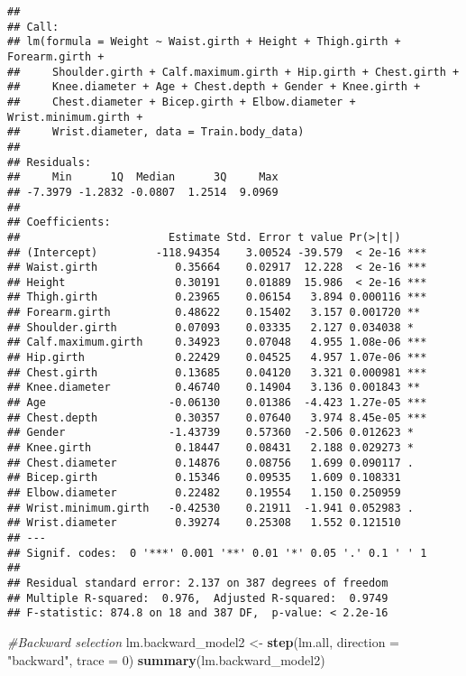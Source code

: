 \documentclass[
]{article}
\newenvironment{Shaded}{\begin{snugshade}}{\end{snugshade}}
\newcommand{\AttributeTok}[1]{\textcolor[rgb]{0.13,0.29,0.53}{#1}}
\newcommand{\CommentTok}[1]{\textcolor[rgb]{0.56,0.35,0.01}{\textit{#1}}}
\newcommand{\DecValTok}[1]{\textcolor[rgb]{0.00,0.00,0.81}{#1}}
\newcommand{\FunctionTok}[1]{\textcolor[rgb]{0.13,0.29,0.53}{\textbf{#1}}}
\newcommand{\NormalTok}[1]{#1}
\newcommand{\OtherTok}[1]{\textcolor[rgb]{0.56,0.35,0.01}{#1}}
\newcommand{\StringTok}[1]{\textcolor[rgb]{0.31,0.60,0.02}{#1}}
\begin{document}
\begin{verbatim}
## 
## Call:
## lm(formula = Weight ~ Waist.girth + Height + Thigh.girth + Forearm.girth + 
##     Shoulder.girth + Calf.maximum.girth + Hip.girth + Chest.girth + 
##     Knee.diameter + Age + Chest.depth + Gender + Knee.girth + 
##     Chest.diameter + Bicep.girth + Elbow.diameter + Wrist.minimum.girth + 
##     Wrist.diameter, data = Train.body_data)
## 
## Residuals:
##     Min      1Q  Median      3Q     Max 
## -7.3979 -1.2832 -0.0807  1.2514  9.0969 
## 
## Coefficients:
##                       Estimate Std. Error t value Pr(>|t|)    
## (Intercept)         -118.94354    3.00524 -39.579  < 2e-16 ***
## Waist.girth            0.35664    0.02917  12.228  < 2e-16 ***
## Height                 0.30191    0.01889  15.986  < 2e-16 ***
## Thigh.girth            0.23965    0.06154   3.894 0.000116 ***
## Forearm.girth          0.48622    0.15402   3.157 0.001720 ** 
## Shoulder.girth         0.07093    0.03335   2.127 0.034038 *  
## Calf.maximum.girth     0.34923    0.07048   4.955 1.08e-06 ***
## Hip.girth              0.22429    0.04525   4.957 1.07e-06 ***
## Chest.girth            0.13685    0.04120   3.321 0.000981 ***
## Knee.diameter          0.46740    0.14904   3.136 0.001843 ** 
## Age                   -0.06130    0.01386  -4.423 1.27e-05 ***
## Chest.depth            0.30357    0.07640   3.974 8.45e-05 ***
## Gender                -1.43739    0.57360  -2.506 0.012623 *  
## Knee.girth             0.18447    0.08431   2.188 0.029273 *  
## Chest.diameter         0.14876    0.08756   1.699 0.090117 .  
## Bicep.girth            0.15346    0.09535   1.609 0.108331    
## Elbow.diameter         0.22482    0.19554   1.150 0.250959    
## Wrist.minimum.girth   -0.42530    0.21911  -1.941 0.052983 .  
## Wrist.diameter         0.39274    0.25308   1.552 0.121510    
## ---
## Signif. codes:  0 '***' 0.001 '**' 0.01 '*' 0.05 '.' 0.1 ' ' 1
## 
## Residual standard error: 2.137 on 387 degrees of freedom
## Multiple R-squared:  0.976,  Adjusted R-squared:  0.9749 
## F-statistic: 874.8 on 18 and 387 DF,  p-value: < 2.2e-16
\end{verbatim}

\begin{Shaded}
\begin{Highlighting}[]
\CommentTok{\#Backward selection}
\NormalTok{lm.backward\_model2 }\OtherTok{\textless{}{-}} \FunctionTok{step}\NormalTok{(lm.all,  }\AttributeTok{direction =} \StringTok{"backward"}\NormalTok{, }\AttributeTok{trace =} \DecValTok{0}\NormalTok{)}
\FunctionTok{summary}\NormalTok{(lm.backward\_model2)}
\end{Highlighting}
\end{Shaded}
\end{document}
